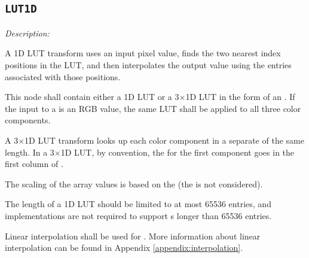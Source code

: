 \subsection{\texttt{LUT1D}}

\emph{Description:} \par
A 1D LUT transform uses an input pixel value, finds the two nearest index positions in the LUT, and then interpolates the output value using the entries associated with those positions. 

This node shall contain either a 1D LUT or a 3$\times$1D LUT in the form of an . If the input to a  is an RGB value, the same LUT shall be applied to all three color components. 

A 3$\times$1D LUT transform looks up each color component in a separate  of the same length.   In a 3$\times$1D LUT, by convention, the  for the first component goes in the first column of .

The scaling of the array values is based on the  (the  is not considered).

The length of a 1D LUT should be limited to at most 65536 entries, and implementations are not required to support s longer than 65536 entries.

Linear interpolation shall be used for . More information about linear interpolation can be found in Appendix \ref{appendix:interpolation}.

